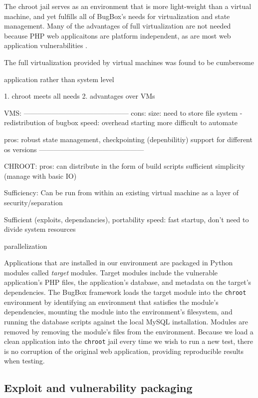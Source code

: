 \documentclass[letterpaper,twocolumn,10pt]{article}
\begin{document}
The chroot jail serves as an environment that is more light-weight than a virtual machine, and yet fulfills all of BugBox's needs for virtualization and state management. Many of the advantages of full virtualization are not needed because PHP web applicaitons are platform independent, as are most web application vulnerabilities \cite{NVD}. 



The full virtualization provided by virtual machines was found to be cumbersome


application rather than system level





1. chroot meets all needs
2. advantages over VMs


VMS:
---------------------------------------------
cons:
 size: need to store file system
       -redistribution of bugbox
 speed: overhead starting
 more difficult to automate

pros:
  robust state management, checkpointing (depenbilitiy)
  support for different os versions
---------------------------------------------

CHROOT:
pros:
  can distribute in the form of build scripts
  sufficient
  simplicity (manage with basic IO)
  

Sufficiency:
  Can be run from within an existing virtual machine as a layer of security/separation

Sufficient (exploits, dependancies), portability
speed: fast startup,
       don't need to divide system resources
       

 parallelization 


Applications that are installed in our environment are packaged in Python modules called \textit{target} modules. Target modules include the vulnerable application's PHP files, the application's database, and metadata on the target's dependencies. The BugBox framework loads the target module into the \texttt{chroot} environment by identifying an environment that satisfies the module's dependencies, mounting the module into the environment's filesystem, and running the database scripts against the local MySQL installation. Modules are removed by removing the module's files from the environment. Because we load a clean application into the {\tt chroot} jail every time we wish to run a new test, there is no corruption of the original web application, providing reproducible results when testing.

\subsection{Exploit and vulnerability packaging}
\end{document}

